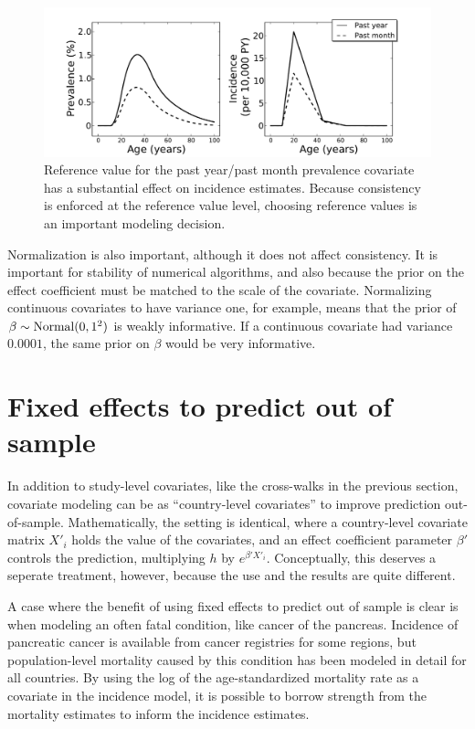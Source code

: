 \begin{figure}[h]
\begin{center}
\includegraphics[width=\textwidth]{bipolar-ref-alts.pdf}
\caption{Reference value for the past year/past month prevalence
  covariate has a substantial effect on incidence estimates.  Because
  consistency is enforced at the reference value level, choosing reference
  values is an important modeling decision.}
\label{bipolar-ref-alts}
\end{center}
\end{figure}


Normalization is also important, although it does not affect
consistency.  It is important for stability of numerical algorithms,
and also because the prior on the effect coefficient must be matched
to the scale of the covariate.  Normalizing continuous covariates to
have variance one, for example, means that the prior of
$\beta\sim\operatorname{Normal}(0,1^2)$ is weakly informative.  If a continuous
covariate had variance $0.0001$, the same prior on $\beta$ would be
very informative.

\section{Fixed effects to predict out of sample}

In addition to study-level covariates, like the cross-walks in the
previous section, covariate modeling can be as ``country-level
covariates'' to improve prediction out-of-sample.  Mathematically, the
setting is identical, where a country-level covariate matrix $X'_i$ holds
the value of the covariates, and an effect coefficient parameter
$\beta'$ controls the prediction, multiplying $h$ by
$e^{\beta' X'_i}$.  Conceptually, this deserves a seperate treatment,
  however, because the use and the results are quite different.

A case where the benefit of using fixed effects to predict out of
sample is clear is when modeling an often fatal condition, like cancer
of the pancreas.  Incidence of pancreatic cancer is available from
cancer registries for some regions, but population-level mortality
caused by this condition has been modeled in detail for all
countries.\cite{CODEm_paper}  By using the log of the age-standardized mortality rate as a
covariate in the incidence model, it is possible to borrow strength
from the mortality estimates to inform the incidence estimates.

